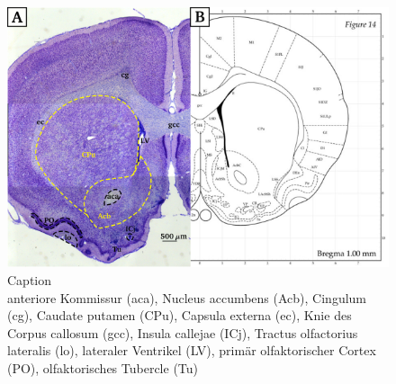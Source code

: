 \documentclass[12pt,a4paper,pdftex]{article}
\begin{document}
\begin{figure}[H]
    \centering
    \includegraphics{pictures/Basalganglia/Nucleus_acumbens.png}
    \caption{Caption\\
    anteriore Kommissur (aca), Nucleus accumbens (Acb), Cingulum (cg), Caudate putamen (CPu), Capsula externa (ec), Knie des Corpus callosum (gcc), Insula callejae (ICj), Tractus olfactorius lateralis (lo), lateraler Ventrikel (LV), primär olfaktorischer Cortex (PO), olfaktorisches Tubercle (Tu)}
    \label{fig:Nucleus_accumbens}
\end{figure}
\end{document}
